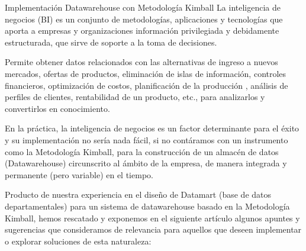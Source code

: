 \documentclass[%
 reprint,
 amsmath,amssymb,
 aps,
]{revtex4-1}
\begin{document}
Implementación Datawarehouse con Metodología Kimball
La inteligencia de negocios (BI) es un conjunto de metodologías, aplicaciones y tecnologías que aporta a empresas y organizaciones información privilegiada y debidamente estructurada, que sirve de soporte a la toma de decisiones.

Permite obtener datos relacionados con las alternativas de ingreso a nuevos mercados, ofertas de productos, eliminación de islas de información, controles financieros, optimización de costos, planificación de la producción , análisis de perfiles de clientes, rentabilidad de un producto, etc., para analizarlos y convertirlos en conocimiento.\cite{estrella4}

En la práctica, la inteligencia de negocios es un factor determinante para el éxito y su implementación  no sería nada fácil, si no contáramos con un instrumento como la Metodología Kimball, para la construcción de un almacén de datos (Datawarehouse)  circunscrito al ámbito de la empresa, de manera integrada y permanente (pero variable) en el tiempo.

Producto de nuestra experiencia en el diseño de Datamart (base de datos departamentales) para un sistema de datawarehouse basado en la Metodología Kimball, hemos rescatado y exponemos en el  siguiente artículo algunos apuntes y sugerencias que consideramos de relevancia para aquellos que deseen implementar o explorar soluciones de esta naturaleza:\cite{estrella6}
\end{document}
